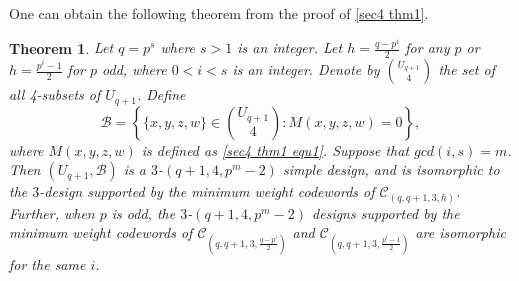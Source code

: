 \documentclass[sn-mathphys-num]{sn-jnl}%
\theoremstyle{thmstyleone}%
\newtheorem{theorem}{Theorem}%
\theoremstyle{thmstyletwo}%
\theoremstyle{thmstylethree}%
\begin{document}
One can obtain the following theorem from the proof of \cref{sec4 thm1}.
\begin{theorem}
	Let $q=p^s$ where $s>1$ is an integer. Let $h=\frac{q-p^i}{2}$ for any $p$ or $h=\frac{p^i-1}{2}$ for $p$ odd, where $0<i<s$ is an integer. Denote by $\binom{U_{q+1}}{4}$ the set of all 4-subsets of $U_{q+1}$. Define 
	\begin{equation*}
		\mathcal{B}=\left\{\{x,y,z,w\}\in\binom{U_{q+1}}{4}:M(x,y,z,w)=0\right\},
	\end{equation*}
	where $M(x,y,z,w)$ is defined as \cref{sec4 thm1 equ1}. Suppose that $gcd(i,s)=m$. Then $(U_{q+1},\mathcal{B})$ is a $3$-$(q+1,4,p^m-2)$ simple design, and is isomorphic to the $3$-design supported by the minimum weight codewords of $\mathcal{C}_{(q,q+1,3,h)}$. Further, when $p$ is odd, the $3$-$(q+1,4,p^m-2)$ designs supported by the minimum weight codewords of $\mathcal{C}_{(q,q+1,3,\frac{q-p^i}{2})}$ and $\mathcal{C}_{(q,q+1,3,\frac{p^i-1}{2})}$ are isomorphic for the same $i$.
\end{theorem}
\end{document}
